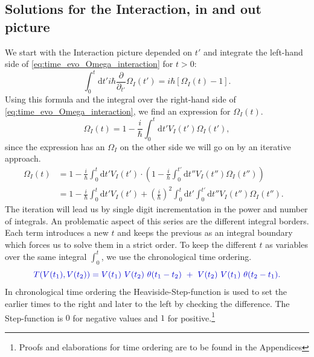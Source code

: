 \documentclass[12pt, titlepage]{article}
\begin{document}
\subsection{Solutions for the Interaction, in  and out picture}
We start with the Interaction picture depended on $ t' $  and integrate the left-hand side of \eqref{eq:time_evo_Omega_interaction} for $ t>0 $:
\begin{equation}
\int_{0}^{t}\mathrm{d}t'
 i\hbar 
 \frac{\partial}{\partial_{t'}} 
 \Omega_{I} (t')
 =
 i\hbar
 \left[ 
\Omega_{I}(t) -1
 \right] 
 .
\end{equation}
Using this formula and the integral over the right-hand side of \eqref{eq:time_evo_Omega_interaction}, we find an expression for $ \Omega_{I}(t) $.
\begin{equation}
\Omega_{I}(t)=
1
-
\frac{i}{\hbar} 
\int_{0}^{t}\mathrm{d}t'V_{I}(t')\Omega_{I}(t')	,
\end{equation}
since the expression has an $ \Omega_{I} $ on the other side we will go on by an iterative approach.
\begin{subequations}
\begin{align}
\Omega_{I}(t)
&=
1
-
\frac{i}{\hbar} 
\int_{0}^{t}\mathrm{d}t'V_{I}(t')
\cdot
\left( 
1
-
\frac{i}{\hbar} 
\int_{0}^{t'}\mathrm{d}t''V_{I}(t'')\Omega_{I}(t'')
\right) 
&\\
&=
1
-
\frac{i}{\hbar} 
\int_{0}^{t}\mathrm{d}t'V_{I}(t')
+(\frac{i}{\hbar})^{2} 
\int_{0}^{t}\mathrm{d}t'
\int_{0}^{t'}\mathrm{d}t''
V_{I}(t'')\Omega_{I}(t'').
\end{align}
\end{subequations}
The iteration will lead us by single digit incrementation in the power and number of integrals. An problematic aspect of this series are the different integral borders. Each term introduces a new $ t $ and keeps the previous as an integral boundary which forces us to solve them in a strict order. To keep the different $ t $ as variables over the same integral $ \int_{0}^{t} $, we use the chronological time ordering.
\begin{equation}\label{eq:chron-time_ordering}
\textcolor[RGB]{0,0,204}{
T(V(t_1), V(t_2))=V(t_1)\ V(t_2)\ \theta (t_1 -t_2)\ +\ V(t_2)\  V(t_1) \ \theta (t_2-t_1)
.}
\end{equation}
In chronological time ordering the Heaviside-Step-function is used to set the earlier times to the right and later to the left by checking the difference. The Step-function is $ 0 $ for negative values and $ 1 $ for positive.\footnote{Proofs and elaborations for time ordering are to be found in the Appendices }
\end{document}
